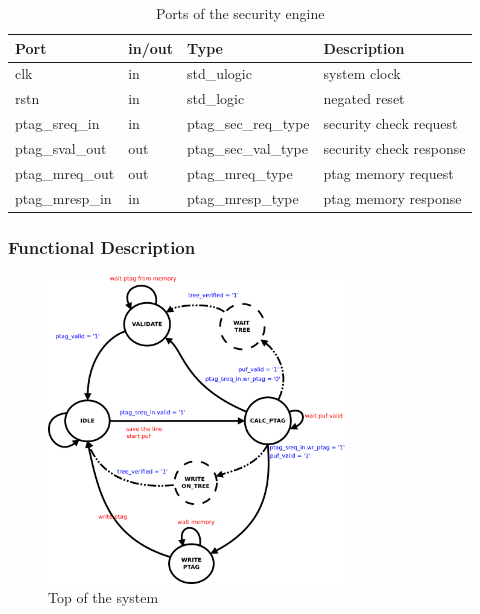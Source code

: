 \begin{table}[H]
\centering
\label{table:seports}
\begin{tabular}{l l l l}

\textbf{Port}   & \textbf{in/out} & \textbf{Type}        & \textbf{Description} 	\\ \hline \hline
clk             & in              & std\_ulogic          & system clock         	\\ \hline
rstn            & in              & std\_logic           & negated reset         	\\ \hline
ptag\_sreq\_in  & in              & ptag\_sec\_req\_type & security check request    	\\ \hline
ptag\_sval\_out & out             & ptag\_sec\_val\_type & security check response  	\\ \hline
ptag\_mreq\_out & out             & ptag\_mreq\_type 	 & ptag memory  request    	\\ \hline
ptag\_mresp\_in & in              & ptag\_mresp\_type 	 & ptag memory  response  	\\ \hline
\end{tabular}
 \caption{Ports of the security engine}
\end{table}




\subsubsection{Functional Description}
  \begin{figure}[H]
    \centering
    \includegraphics[width=0.70\textwidth]{figures/pdf/sec_engine_sm.pdf}
    \caption{Top of the system  }
    \label{fig:sesm}
\end{figure}



